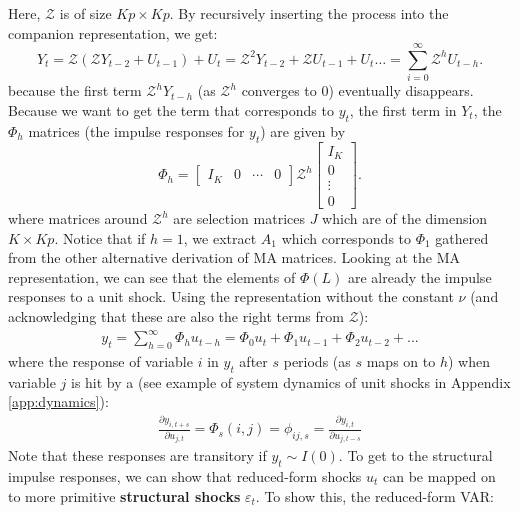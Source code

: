 \documentclass[a4paper, 12pt]{article}
\begin{document}
\noindent Here, $\mathcal{Z}$ is of size $Kp \times Kp$. By recursively inserting the process into the companion representation, we get:
\[ Y_t = \mathcal{Z} (\mathcal{Z} Y_{t-2} + U_{t-1}) + U_t = \mathcal{Z}^2 Y_{t-2} + \mathcal{Z}U_{t-1} + U_t \ldots =
\sum_{i=0}^{\infty} \mathcal{Z}^h U_{t-h}.
\]
\noindent because the first term $\mathcal{Z}^h Y_{t-h}$ (as $\mathcal{Z}^h$ converges to 0) eventually disappears. Because we want to get the term that corresponds to $y_t$, the first term in $Y_t$, the $\Phi_h$ matrices (the impulse responses for $y_t$) are given by
\[
\Phi_h =
\begin{bmatrix}
I_K & 0 & \cdots & 0
\end{bmatrix}
\mathcal{Z}^h
\begin{bmatrix}
I_K \\ 0 \\ \vdots \\ 0
\end{bmatrix}.
\]
\noindent where matrices around $\mathcal{Z}^h$ are selection matrices $J$ which are of the dimension $K\times Kp$. Notice that if $h=1$, we extract $A_1$ which corresponds to $\Phi_1$ gathered from the other alternative derivation of MA matrices. Looking at the MA representation, we can see that the elements of $\Phi(L)$ are already the impulse responses to a unit shock. Using the representation without the constant $\nu$ (and acknowledging that these are also the right terms from $\mathcal{Z}$):
\begin{equation}
\begin{aligned}
y_t=\sum_{h=0}^\infty\Phi_hu_{t-h}=\Phi_0 u_t+\Phi_1 u_{t-1}+\Phi_2 u_{t-2}+...\nonumber
\end{aligned}
\end{equation}
where the response of variable $i$ in $y_t$ after $s$ periods (as $s$ maps on to $h$) when variable $j$ is hit by a  (see example of system dynamics of unit shocks in Appendix \ref{app:dynamics}):
\begin{equation}
\begin{aligned}
\frac{\partial y_{i,t+s}}{\partial u_{j,t}}=\Phi_s(i,j)=\phi_{ij,s}= \frac{\partial y_{i,t}}{\partial u_{j,t-s}}\nonumber
\end{aligned}
\end{equation}
Note that these responses are transitory if $y_t\sim I(0)$. To get to the structural impulse responses, we can show that reduced-form shocks $u_t$ can be mapped on to more primitive \textbf{structural shocks} $\varepsilon_t$. To show this, the reduced-form VAR:
\end{document}
